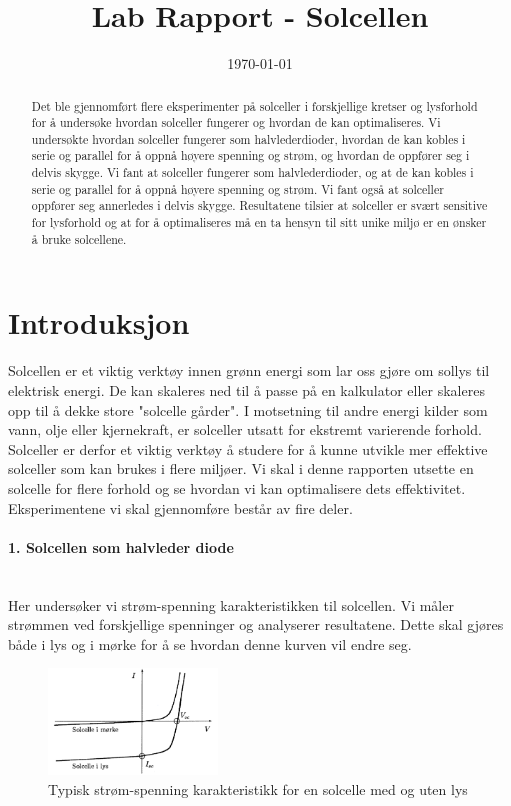 \documentclass[reprint,norsk,notitlepage]{revtex4-2}
\begin{document}
\title{Lab Rapport - Solcellen}
\author{}
\date{\today}

\begin{abstract}
    Det ble gjennomført flere eksperimenter på solceller i forskjellige kretser og lysforhold for å undersøke hvordan solceller fungerer og hvordan de kan optimaliseres. Vi undersøkte hvordan solceller fungerer som halvlederdioder, hvordan de kan kobles i serie og parallel for å oppnå høyere spenning og strøm, og hvordan de oppfører seg i delvis skygge. Vi fant at solceller fungerer som halvlederdioder, og at de kan kobles i serie og parallel for å oppnå høyere spenning og strøm. Vi fant også at solceller oppfører seg annerledes i delvis skygge. Resultatene tilsier at solceller er svært sensitive for lysforhold og at for å optimaliseres må en ta hensyn til sitt unike miljø er en ønsker å bruke solcellene. 
\end{abstract}

\maketitle

\section{Introduksjon} \label{sec: introduction}
Solcellen er et viktig verktøy innen grønn energi som lar oss gjøre om sollys til elektrisk energi. De kan skaleres ned til å passe på en kalkulator eller skaleres opp til å dekke store "solcelle gårder". I motsetning til andre energi kilder som vann, olje eller kjernekraft, er solceller utsatt for ekstremt varierende forhold. Solceller er derfor et viktig verktøy å studere for å kunne utvikle mer effektive solceller som kan brukes i flere miljøer. Vi skal i denne rapporten utsette en solcelle for flere forhold og se hvordan vi kan optimalisere dets effektivitet. Eksperimentene vi skal gjennomføre består av fire deler.\newline

\paragraph*{1. Solcellen som halvleder diode}\mbox{}\\
Her undersøker vi strøm-spenning karakteristikken til solcellen. Vi måler strømmen ved forskjellige spenninger og analyserer resultatene. Dette skal gjøres både i lys og i mørke for å se hvordan denne kurven vil endre seg.
\begin{figure}[h!]
  \centering
  \includegraphics[width = 0.4\textwidth]{SS_kurve.png}
  \caption{Typisk strøm-spenning karakteristikk for en solcelle med og uten lys}
  \label{fig: SS_kurve}
\end{figure}
\end{document}
